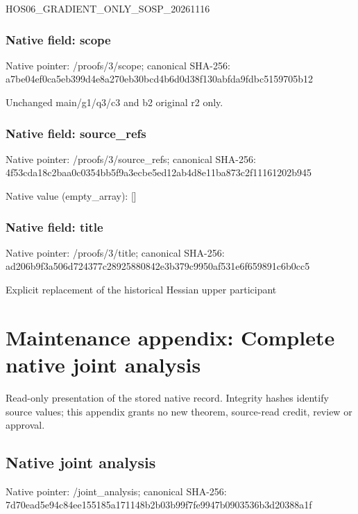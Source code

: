 \documentclass[10pt,a4paper]{article}
\begin{document}
\begingroup\raggedright\sloppy HOS06\_\allowbreak{}GRADIENT\_\allowbreak{}ONLY\_\allowbreak{}SOSP\_\allowbreak{}20261116\par\endgroup

\subsubsection{Native field: scope}
Native pointer: /proofs/3/scope; canonical SHA-256: a7be04ef0ca5eb399d4e8a270eb30bcd4b6d0d38f130abfda9fdbc5159705b12

\begingroup\raggedright\sloppy Unchanged main/\allowbreak{}g1/\allowbreak{}q3/\allowbreak{}c3 and b2 original r2 only.\par\endgroup

\subsubsection{Native field: source\_\allowbreak{}refs}
Native pointer: /proofs/3/source\_\allowbreak{}refs; canonical SHA-256: 4f53cda18c2baa0c0354bb5f9a3ecbe5ed12ab4d8e11ba873c2f11161202b945

Native value (empty\_\allowbreak{}array): []

\subsubsection{Native field: title}
Native pointer: /proofs/3/title; canonical SHA-256: ad206b9f3a506d724377c28925880842e3b379c9950af531e6f659891c6b0cc5

\begingroup\raggedright\sloppy Explicit replacement of the historical Hessian upper participant\par\endgroup

\section{Maintenance appendix: Complete native joint analysis}
Read-only presentation of the stored native record. Integrity hashes identify source values; this appendix grants no new theorem, source-read credit, review or approval.

\subsection{Native joint analysis}
Native pointer: /joint\_\allowbreak{}analysis; canonical SHA-256: 7d70ead5e94c84ee155185a171148b2b03b99f7fe9947b0903536b3d20388a1f
\end{document}
